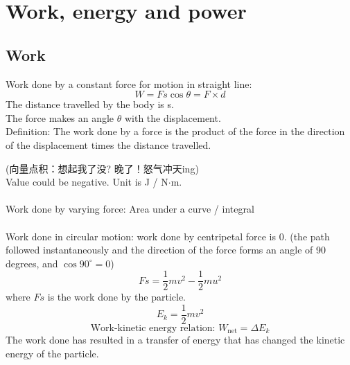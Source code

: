 \documentclass[a4paper,12pt]{article}
\begin{document}
\section{Work, energy and power}
\subsection{Work}
Work done by a constant force for motion in straight line:
\[W=Fs\cos\theta=F\times d\]
The distance travelled by the body is s. \\The force makes an angle $\theta$ with the displacement. \\Definition: The work done by a force is the product of the force in the direction of the displacement times the distance travelled.
\begin{center}
\end{center}
(向量点积：想起我了没? 晚了！怒气冲天ing)\\
Value could be negative. Unit is J / N$\cdot$m.\\\\
Work done by varying force: Area under a curve / integral\\\\
Work done in circular motion: work done by centripetal force is 0. (the path followed instantaneously and the direction of the force forms an angle of 90 degrees, and $\cos 90^\circ=0$)
\[Fs=\dfrac{1}{2}mv^2-\dfrac{1}{2}mu^2\]
where $Fs$ is the work done by the particle.
\[E_k=\dfrac{1}{2}mv^2\]
\[\text{Work-kinetic energy relation: }W_\text{net}=\Delta E_k\]
The work done has resulted in a transfer of energy that has changed the kinetic energy of the particle.\\\\
\end{document}
